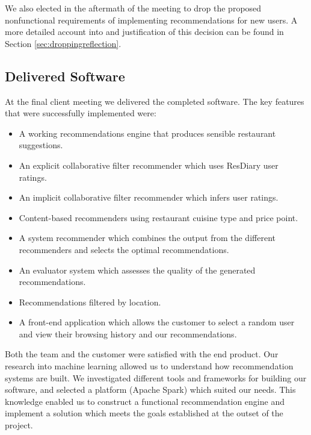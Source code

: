 \documentclass{l3proj}
\begin{document}
We also elected in the aftermath of the meeting to drop the proposed nonfunctional requirements of implementing recommendations for new users. A more detailed account into and justification of this decision can be found in Section \ref{sec:droppingreflection}.

\subsection{Delivered Software}
\label{sec:finsoftware}

At the final client meeting we delivered the completed software. The key features that were successfully implemented were:

\begin{itemize}
\item A working recommendations engine that produces sensible restaurant suggestions. 
\item An explicit collaborative filter recommender which uses ResDiary user ratings.
\item An implicit collaborative filter recommender which infers user ratings.
\item Content-based recommenders using restaurant cuisine type and price point.
\item A system recommender which combines the output from the different recommenders and selects the optimal recommendations.
\item An evaluator system which assesses the quality of the generated recommendations.
\item Recommendations filtered by location. 
\item A front-end application which allows the customer to select a random user and view their browsing history and our recommendations.
\end{itemize}

Both the team and the customer were satisfied with the end product. Our research into machine learning allowed us to understand how recommendation systems are built. We investigated different tools and frameworks for building our software, and selected a platform (Apache Spark) which suited our needs. This knowledge enabled us to construct a functional recommendation engine and implement a solution which meets the goals established at the outset of the project. 
\end{document}

